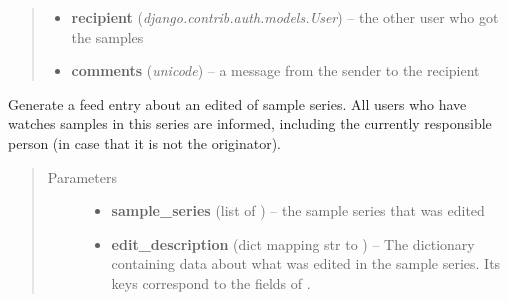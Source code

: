 \documentclass[a4paper,11pt,english]{sphinxmanual}
\begin{document}
\begin{fulllineitems}
\begin{fulllineitems}
\begin{quote}
\begin{description}
\begin{itemize}
\item {} 
\textbf{recipient} (\emph{django.contrib.auth.models.User}) -- the other user who got the samples

\item {} 
\textbf{comments} (\emph{unicode}) -- a message from the sender to the recipient

\end{itemize}

\end{description}\end{quote}

\end{fulllineitems}


\begin{fulllineitems}
\label{programming/utilities:samples.utils.views.Reporter.report_edited_sample_series}
Generate a feed entry about an edited of sample series.  All users
who have watches samples in this series are informed, including the
currently responsible person (in case that it is not the originator).
\begin{quote}\begin{description}
\item[{Parameters}] \leavevmode\begin{itemize}
\item {} 
\textbf{sample\_series} (list of ) -- the sample series that was edited

\item {} 
\textbf{edit\_description} (dict mapping str to ) -- The dictionary containing data about what was
edited in the sample series.  Its keys correspond to the fields of
{\hyperref[programming/utilities:samples.utils.views.EditDescriptionForm]{}}.

\end{itemize}

\end{description}\end{quote}

\end{fulllineitems}



\end{fulllineitems}
\end{document}
